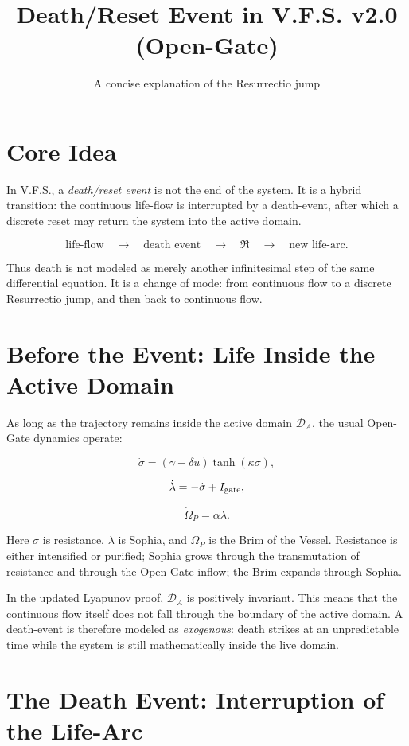 \documentclass[11pt]{article}
\title{Death/Reset Event in V.F.S. v2.0 (Open-Gate)}
\author{A concise explanation of the Resurrectio jump}
\date{}
\newcommand{\DA}{\mathcal D_A}
\newcommand{\Igate}{I_{\rm gate}}
\newcommand{\Om}{\Omega_P}
\begin{document}
\maketitle

\section*{Core Idea}

In V.F.S., a \emph{death/reset event} is not the end of the system. It is a hybrid transition: the continuous life-flow is interrupted by a death-event, after which a discrete reset may return the system into the active domain.

\[
\text{life-flow}
\quad\longrightarrow\quad
\text{death event}
\quad\longrightarrow\quad
\mathfrak R
\quad\longrightarrow\quad
\text{new life-arc}.
\]

Thus death is not modeled as merely another infinitesimal step of the same differential equation. It is a change of mode: from continuous flow to a discrete Resurrectio jump, and then back to continuous flow.

\section{Before the Event: Life Inside the Active Domain}

As long as the trajectory remains inside the active domain \(\DA\), the usual Open-Gate dynamics operate:

\[
\dot\sigma=(\gamma-\delta u)\tanh(\kappa\sigma),
\]

\[
\dot\lambda=-\dot\sigma+\Igate,
\]

\[
\dot\Om=\alpha\lambda.
\]

Here \(\sigma\) is resistance, \(\lambda\) is Sophia, and \(\Om\) is the Brim of the Vessel. Resistance is either intensified or purified; Sophia grows through the transmutation of resistance and through the Open-Gate inflow; the Brim expands through Sophia.

In the updated Lyapunov proof, \(\DA\) is positively invariant. This means that the continuous flow itself does not fall through the boundary of the active domain. A death-event is therefore modeled as \emph{exogenous}: death strikes at an unpredictable time while the system is still mathematically inside the live domain.

\section{The Death Event: Interruption of the Life-Arc}
\end{document}
